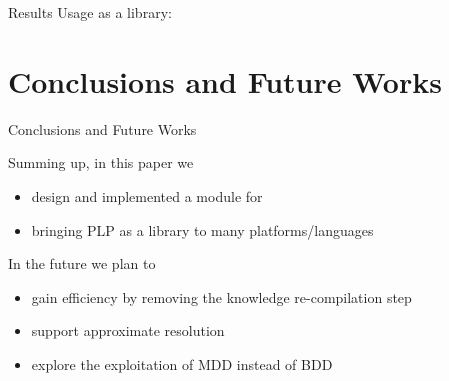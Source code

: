 \documentclass[presentation]{beamer}\mode<presentation>{\usetheme{AMSBolognaFC}}
\begin{document}
\begin{frame}[c, allowframebreaks]{Results}
    Usage as a library:

    

    

    

    

\end{frame}

\section{Conclusions and Future Works}

\begin{frame}[c]{Conclusions and Future Works}

    \begin{block}{Summing up, in this paper we}
        \begin{itemize}
            \item design and implemented a \problog{} module for \twopkt{}
            \item bringing PLP as a library to many platforms/languages
        \end{itemize}
    \end{block}

    \begin{exampleblock}{In the future we plan to}
        \begin{itemize}
            \item gain efficiency by removing the knowledge re-compilation step
            \item support approximate resolution
            \item explore the exploitation of MDD instead of BDD
        \end{itemize}
    \end{exampleblock}

\end{frame}
\end{document}
